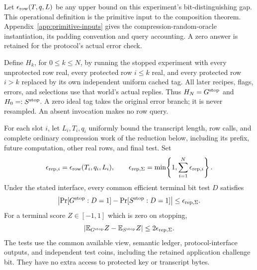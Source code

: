 Let $\epsilon_{\rm row}(T,q,L)$ be any upper bound on this experiment's
bit-distinguishing gap. This operational definition is the primitive input to
the composition theorem. Appendix~\ref{app:primitive-inputs} gives the
compression-random-oracle instantiation, its padding convention and query
accounting. A zero answer is retained for the protocol's actual error check.

Define $H_k$, for $0\le k\le N$, by running the stopped experiment with every
unprotected row real, every protected row $i\le k$ real, and every protected
row $i>k$ replaced by its own independent uniform cached tag.  All later
recipes, flags, errors, and selections use that world's actual replies.
Thus $H_N=G^{\rm stop}$ and $H_0=:S^{\rm stop}$.  A zero ideal tag takes the
original error branch; it is never resampled.  An absent invocation makes no
row query.

\begin{theorem}
\label{thm:report-reverse-composition}
For each slot $i$, let $L_i,T_i,q_i$ uniformly bound the transcript length,
row calls, and complete ordinary compression work of the reduction below,
including its prefix, future computation, other real rows, and final test.
Set
\[
 \epsilon_{{\rm rep},i}
   =\epsilon_{\rm row}(T_i,q_i,L_i),
 \qquad
 \epsilon_{{\rm rep},\Sigma}
   =\min\!\left\{1,\sum_{i=1}^N\epsilon_{{\rm rep},i}\right\}.
\]
Under the stated interface, every common efficient terminal bit test $D$
satisfies
\[
 \left|\Pr[G^{\rm stop}:D=1]
       -\Pr[S^{\rm stop}:D=1]\right|
 \le\epsilon_{{\rm rep},\Sigma}.
\]
For a terminal score $Z\in[-1,1]$ which is zero on stopping,
\[
 \left|\mathbb E_{G^{\rm stop}}Z
       -\mathbb E_{S^{\rm stop}}Z\right|
 \le2\epsilon_{{\rm rep},\Sigma}.
\]
The tests use the common available view, semantic ledger, protocol-interface
outputs, and independent test coins, including the retained application
challenge bit.  They have no extra access to protected key or transcript bytes.
\end{theorem}

